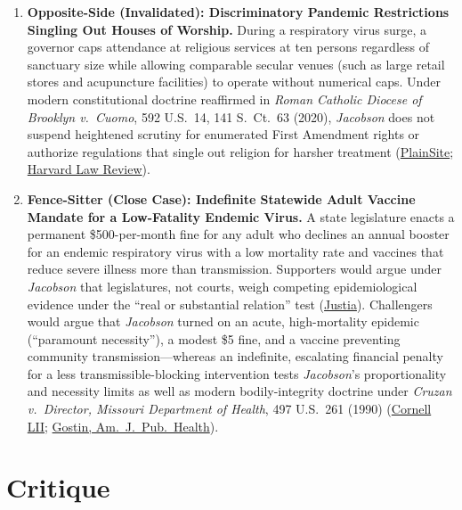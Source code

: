 \documentclass[12pt]{article}
\begin{document}
\begin{enumerate}
\item \textbf{Opposite-Side (Invalidated): Discriminatory Pandemic Restrictions Singling Out Houses of Worship.} During a respiratory virus surge, a governor caps attendance at religious services at ten persons regardless of sanctuary size while allowing comparable secular venues (such as large retail stores and acupuncture facilities) to operate without numerical caps. Under modern constitutional doctrine reaffirmed in \textit{Roman Catholic Diocese of Brooklyn v.\ Cuomo}, 592 U.S.\ 14, 141 S.\ Ct.\ 63 (2020), \textit{Jacobson} does not suspend heightened scrutiny for enumerated First Amendment rights or authorize regulations that single out religion for harsher treatment (\href{https://www.plainsite.org/opinions/1jlepwj8p/roman-catholic-diocese-of-brooklyn-v-cuomo/}{PlainSite}; \href{https://harvardlawreview.org/print/vol-134/constitutional-constraints-on-free-exercise-analogies/}{Harvard Law Review}).

\item \textbf{Fence-Sitter (Close Case): Indefinite Statewide Adult Vaccine Mandate for a Low-Fatality Endemic Virus.} A state legislature enacts a permanent \$500-per-month fine for any adult who declines an annual booster for an endemic respiratory virus with a low mortality rate and vaccines that reduce severe illness more than transmission. Supporters would argue under \textit{Jacobson} that legislatures, not courts, weigh competing epidemiological evidence under the ``real or substantial relation'' test (\href{https://supreme.justia.com/cases/federal/us/197/11/}{Justia}). Challengers would argue that \textit{Jacobson} turned on an acute, high-mortality epidemic (``paramount necessity''), a modest \$5 fine, and a vaccine preventing community transmission---whereas an indefinite, escalating financial penalty for a less transmissible-blocking intervention tests \textit{Jacobson}'s proportionality and necessity limits as well as modern bodily-integrity doctrine under \textit{Cruzan v.\ Director, Missouri Department of Health}, 497 U.S.\ 261 (1990) (\href{https://www.law.cornell.edu/constitution-conan/amendment-14/right-to-refuse-medical-treatment-and-substantive-due-process}{Cornell LII}; \href{https://pmc.ncbi.nlm.nih.gov/articles/PMC1449223/}{Gostin, Am.\ J.\ Pub.\ Health}).
\end{enumerate}

\section{Critique}
\end{document}
